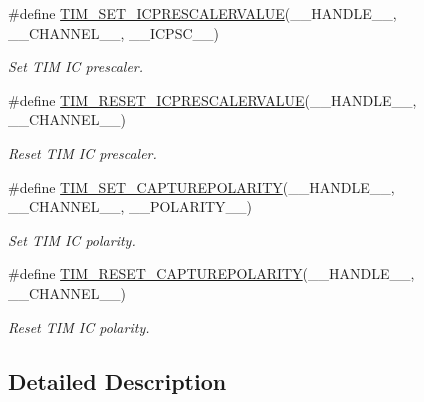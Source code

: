 \begin{DoxyCompactItemize}
\item 
\#define \hyperlink{group___t_i_m___private___macros_ga99724157918ca8b4d8babee1d8008dcb}{T\-I\-M\-\_\-\-S\-E\-T\-\_\-\-I\-C\-P\-R\-E\-S\-C\-A\-L\-E\-R\-V\-A\-L\-U\-E}(\-\_\-\-\_\-\-H\-A\-N\-D\-L\-E\-\_\-\-\_\-, \-\_\-\-\_\-\-C\-H\-A\-N\-N\-E\-L\-\_\-\-\_\-, \-\_\-\-\_\-\-I\-C\-P\-S\-C\-\_\-\-\_\-)
\begin{DoxyCompactList}\small\item\em Set T\-I\-M I\-C prescaler. \end{DoxyCompactList}\item 
\#define \hyperlink{group___t_i_m___private___macros_ga18ded32faf42c8981c8d2970bb02e126}{T\-I\-M\-\_\-\-R\-E\-S\-E\-T\-\_\-\-I\-C\-P\-R\-E\-S\-C\-A\-L\-E\-R\-V\-A\-L\-U\-E}(\-\_\-\-\_\-\-H\-A\-N\-D\-L\-E\-\_\-\-\_\-, \-\_\-\-\_\-\-C\-H\-A\-N\-N\-E\-L\-\_\-\-\_\-)
\begin{DoxyCompactList}\small\item\em Reset T\-I\-M I\-C prescaler. \end{DoxyCompactList}\item 
\#define \hyperlink{group___t_i_m___private___macros_ga4321d7371ca3a8c18f96e925667a7b2f}{T\-I\-M\-\_\-\-S\-E\-T\-\_\-\-C\-A\-P\-T\-U\-R\-E\-P\-O\-L\-A\-R\-I\-T\-Y}(\-\_\-\-\_\-\-H\-A\-N\-D\-L\-E\-\_\-\-\_\-, \-\_\-\-\_\-\-C\-H\-A\-N\-N\-E\-L\-\_\-\-\_\-, \-\_\-\-\_\-\-P\-O\-L\-A\-R\-I\-T\-Y\-\_\-\-\_\-)
\begin{DoxyCompactList}\small\item\em Set T\-I\-M I\-C polarity. \end{DoxyCompactList}\item 
\#define \hyperlink{group___t_i_m___private___macros_gada7535acf7e1f9b3e8e1dcca848871db}{T\-I\-M\-\_\-\-R\-E\-S\-E\-T\-\_\-\-C\-A\-P\-T\-U\-R\-E\-P\-O\-L\-A\-R\-I\-T\-Y}(\-\_\-\-\_\-\-H\-A\-N\-D\-L\-E\-\_\-\-\_\-, \-\_\-\-\_\-\-C\-H\-A\-N\-N\-E\-L\-\_\-\-\_\-)
\begin{DoxyCompactList}\small\item\em Reset T\-I\-M I\-C polarity. \end{DoxyCompactList}\end{DoxyCompactItemize}


\subsection{Detailed Description}


